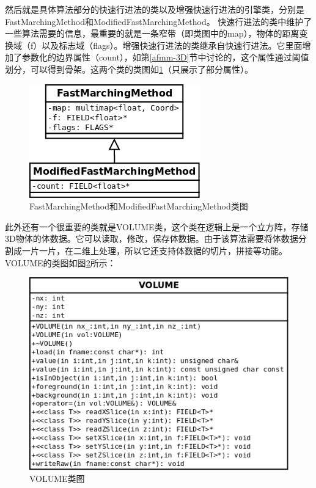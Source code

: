 然后就是具体算法部分的快速行进法的类以及增强快速行进法的引擎类，分别是FastMarchingMethod和ModifiedFastMarchingMethod。
快速行进法的类中维护了一些算法需要的信息，最重要的就是一条窄带（即类图中的map），物体的距离变换域（f）以及标志域（flags）。增强快速行进法的类继承自快速行进法。它里面增加了参数化的边界属性（count），如第\ref{afmm-3D}节中讨论的，这个属性通过阈值划分，可以得到骨架。这两个类的类图如\ref{fmm-mfmm-class}（只展示了部分属性）。
\begin{figure}[h!]
    \centering
    \includegraphics[width=210bp]{figure/fmm_mfmm.png}
    \caption{FastMarchingMethod和ModifiedFastMarchingMethod类图}
    \label{fmm-mfmm-class}
\end{figure}

此外还有一个很重要的类就是VOLUME类，这个类在逻辑上是一个立方阵，存储3D物体的体数据。它可以读取，修改，保存体数据。由于该算法需要将体数据分割成一片一片，在二维上处理，所以它还支持体数据的切片，拼接等功能。
VOLUME的类图如图\ref{volume-class}所示：
\begin{figure}[h!]
    \centering
    \includegraphics[width=340bp]{figure/volume.png}
    \caption{VOLUME类图}
    \label{volume-class}
\end{figure}

